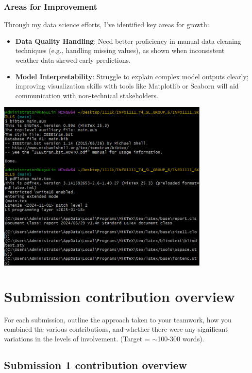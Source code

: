 \documentclass[a4paper, 11pt]{report}
\begin{document}
\subsubsection*{Areas for Improvement}
Through my data science efforts, I've identified key areas for growth:
\begin{itemize}
    \item \textbf{Data Quality Handling}: Need better proficiency in manual data cleaning techniques (e.g., handling missing values), as shown when inconsistent weather data skewed early predictions.
    \item \textbf{Model Interpretability}: Struggle to explain complex model outputs clearly; improving visualization skills with tools like Matplotlib or Seaborn will aid communication with non-technical stakeholders.
\end{itemize}
\begin{center}
\includegraphics[width=0.8\textwidth]{link/44.png}
\end{center}


\newpage

\section{Submission contribution overview}

For each submission, outline the approach taken to your teamwork, how you combined the various contributions, and whether there were any significant variations in the levels of involvement. (Target = $\sim$100-300 words).

\subsection{Submission 1 contribution overview}
\end{document}
